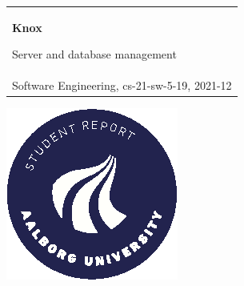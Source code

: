 %
\begin{titlepage}
\vspace*{\fill}
  \addtolength{\hoffset}{0.5\evensidemargin-0.5\oddsidemargin} %
  \noindent%
  {\color{white}\colorbox{aaublue}{\begin{tabular}{@{}p{\textwidth}@{}}
    \begin{center}
    \Huge{\textbf{
      Knox %
    }}
    \end{center}
    \begin{center}
      \Large{
        Server and database management %
      }
    \end{center}
    \vspace{0.2cm}
   \begin{center}
    {\Large
      Christian Bager Bach Houmann, Daniel Overvad Nykjær, Ivik Lau Dalgas Hostrup, Marco Klaustrup Justesen, Patrick Frostholm Østergaard, Rasmus Høyer Hansen %
    }\\
    \vspace{0.2cm}
    {\large
      Software Engineering, cs-21-sw-5-19, 2021-12%
    }
   \end{center}
   \vspace{0.2cm}
   \begin{center}
    {\Large
      5th semester
    }
   \end{center}
  \end{tabular}}}
  \vfill
  \begin{center}
    \includegraphics[width=0.2\paperwidth]{AAUgraphics/aau_logo_circle_en}%
  \end{center}
\end{titlepage}
\clearpage
